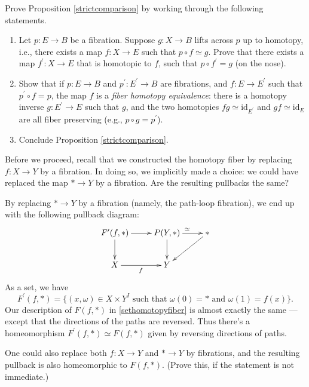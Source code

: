 \begin{exercise}
    Prove Proposition \ref{strictcomparison} by working through the following statements.
    \begin{enumerate}
	\item Let $p:E\to B$ be a fibration.
	    Suppose $g:X \to B$ lifts across $p$ up to homotopy, i.e., there exists a map $f:X\to E$ such that
	    $p \circ f \simeq g$.
	    Prove that there exists a map $f^\prime:X\to E$ that is homotopic to $f$, such that $p \circ f^\prime = g$
	    (on the nose).
	\item Show that if $p:E\to B$ and $p^\prime:E^\prime \to B$ are fibrations, and $f:E \to E^\prime$ such that
	    $p^\prime \circ f = p$, the map $f$ is a \emph{fiber homotopy equivalence}: there is a homotopy inverse
	    $g: E^\prime \to E$ such that $g$, and the two homotopies $fg \simeq \mathrm{id}_{E^\prime}$ and
	    $gf \simeq \mathrm{id}_{E}$ are all fiber preserving (e.g., $p\circ g = p^\prime$).
	\item Conclude Proposition \ref{strictcomparison}.
   \end{enumerate}
\end{exercise}

Before we proceed, recall that we constructed the homotopy fiber by replacing $f:X\to Y$ by a fibration.
In doing so, we implicitly made a choice: we could have replaced the map $\ast\to Y$ by a fibration.
Are the resulting pullbacks the same?

By replacing $\ast \to Y$ by a fibration (namely, the path-loop fibration), we end up with the following pullback diagram:
\begin{equation*}
    \xymatrix{
	F^\prime(f,\ast)\ar[r]\ar[d] & P(Y,\ast)\ar[r]^{\simeq}\ar[d] & \ast\ar[dl]\\
	X\ar[r]_f & Y & 
    }
\end{equation*}
As a set, we have
$$F^\prime(f,\ast) = \{(x,\omega)\in X\times Y^I\text{ such that }\omega(0) = \ast\text{ and }\omega(1) = f(x)\}.$$
Our description of $F(f,\ast)$ in \eqref{sethomotopyfiber} is almost exactly the same --- except that
the directions of the paths are reversed.
Thus there's a homeomorphism $F^\prime(f,\ast) \simeq F(f,\ast)$ given by reversing directions of paths.
\begin{remark}
    One could also replace both $f:X\to Y$ and $\ast\to Y$ by fibrations, and the resulting pullback is also homeomorphic
    to $F(f,\ast)$. (Prove this, if the statement is not immediate.)
\end{remark}

